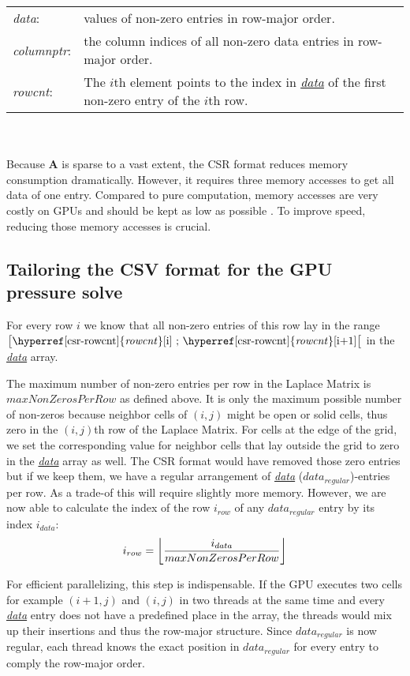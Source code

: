 \begin{tabular}{ll}
	\textit{data\label{csr-data}}: & values of non-zero entries in row-major order.\\
	\textit{columnptr\label{csr-columnptr}}: & the column indices of all non-zero data entries in row-major order.\\
	\textit{rowcnt\label{csr-rowcnt}}: & The $i$th element points to the index in \hyperref[csr-data]{\textit{data}} of the first non-zero entry of the $i$th row.
\end{tabular}\\\\
Because \textbf{A} is sparse to a vast extent, the CSR format reduces memory consumption dramatically. However, it requires three memory accesses to get all data of one entry. Compared to pure computation, memory accesses are very costly on GPUs and should be kept as low as possible \parencite{fang2018benchmarking}\parencite{fujii2013data}. To improve speed, reducing those memory accesses is crucial.

\subsection{Tailoring the CSV format for the GPU pressure solve}\label{laplace-optimization}
For every row $i$ we know that all non-zero entries of this row lay in the range $\big[\text{\hyperref[csr-rowcnt]{\textit{rowcnt}}[i] ; \hyperref[csr-rowcnt]{\textit{rowcnt}}[i+1]}\big[$ in the \hyperref[csr-data]{\textit{data}} array. 
\par The maximum number of non-zero entries per row in the Laplace Matrix is $maxNonZerosPerRow$ as defined above. It is only the maximum possible number of non-zeros because neighbor cells of $(i,j)$ might be open or solid cells, thus zero in the $(i,j)$th row of the Laplace Matrix. For cells at the edge of the grid, we set the corresponding value for neighbor cells that lay outside the grid to zero in the \hyperref[csr-data]{\textit{data}} array as well. The CSR format would have removed those zero entries but if we keep them, we have a regular arrangement of \hyperref[csr-data]{\textit{data}} ($data_{regular}$)-entries per row. As a trade-of this will require slightly more memory. However, we are now able to calculate the index of the row $i_{row}$ of any \hyperref[csr-data]{$data_{regular}$} entry by its index $i_{data}$:
\begin{equation} \label{row-index-by-data-index}
	i_{row} = \floor*{\frac{i_{data}}{maxNonZerosPerRow}}
\end{equation}
\par For efficient parallelizing, this step is indispensable. If the GPU executes two cells for example $(i+1,j)$ and $(i,j)$ in two threads at the same time and every \hyperref[csr-data]{\textit{data}} entry does not have a predefined place in the array, the threads would mix up their insertions and thus the row-major structure. Since $data_{regular}$ is now regular, each thread knows the exact position in $data_{regular}$ for every entry to comply the row-major order.
\newpage

